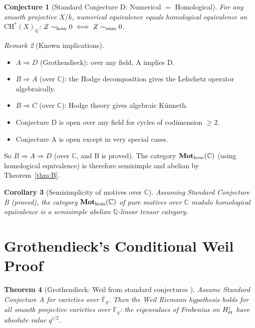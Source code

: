 \documentclass[12pt]{article}
\newtheorem{theorem}{Theorem}
\newtheorem{corollary}[theorem]{Corollary}
\newtheorem{conjecture}[theorem]{Conjecture}
\theoremstyle{definition}
\theoremstyle{remark}
\newtheorem{remark}[theorem]{Remark}
\begin{document}
\begin{conjecture}[Standard Conjecture D: Numerical $=$ Homological]\label{conj:D}
For any smooth projective $X/k$, numerical equivalence equals homological
equivalence on $\mathrm{CH}^*(X)_\mathbb{Q}$:
$Z\sim_{\rm hom}0 \iff Z\sim_{\rm num}0$.
\end{conjecture}

\begin{remark}[Known implications]
\begin{itemize}
\item $A \Rightarrow D$ (Grothendieck): over any field, A implies D.
\item $B \Rightarrow A$ (over $\mathbb{C}$): the Hodge decomposition gives the
  Lefschetz operator algebraically.
\item $B \Rightarrow C$ (over $\mathbb{C}$): Hodge theory gives algebraic Künneth.
\item Conjecture D is open over any field for cycles of codimension $\geq 2$.
\item Conjecture A is open except in very special cases.
\end{itemize}
So $B \Rightarrow A \Rightarrow D$ (over $\mathbb{C}$, and B is proved).
The category $\mathbf{Mot}_{\rm hom}(\mathbb{C})$ (using homological equivalence)
is therefore semisimple and abelian by Theorem~\ref{thm:B}.
\end{remark}

\begin{corollary}[Semisimplicity of motives over $\mathbb{C}$]\label{cor:semisimple}
Assuming Standard Conjecture B (proved), the category
$\mathbf{Mot}_{\rm hom}(\mathbb{C})$ of pure motives over $\mathbb{C}$
modulo homological equivalence is a semisimple abelian $\mathbb{Q}$-linear tensor
category.
\end{corollary}

\section{Grothendieck's Conditional Weil Proof}

\begin{theorem}[Grothendieck: Weil from standard conjectures \cite{grothendieck1968}]
\label{thm:grothendieck_weil}
Assume Standard Conjecture A for varieties over $\overline{\mathbb{F}}_q$.
Then the Weil Riemann hypothesis holds for all smooth projective varieties over
$\mathbb{F}_q$: the eigenvalues of Frobenius on $H^i_{\rm\acute{e}t}$ have
absolute value $q^{i/2}$.
\end{theorem}
\end{document}
